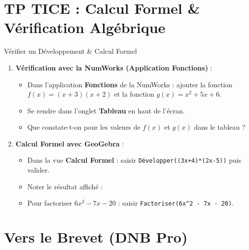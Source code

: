 \section{TP TICE : Calcul Formel \& Vérification Algébrique}

\begin{tpinfo}{Vérifier un Développement \& Calcul Formel}
\begin{enumerate}
    \item \textbf{Vérification avec la NumWorks (Application Fonctions)} :
    \begin{itemize}
        \item Dans l'application \textbf{Fonctions} de la NumWorks : ajouter la fonction $f(x) = (x+3)(x+2)$ et la fonction $g(x) = x^2 + 5x + 6$.
        \item Se rendre dans l'onglet \textbf{Tableau} en haut de l'écran.
        \item Que constate-t-on pour les valeurs de $f(x)$ et $g(x)$ dans le tableau ? \pointille[4cm]
    \end{itemize}
    \item \textbf{Calcul Formel avec GeoGebra} :
    \begin{itemize}
        \item Dans la vue \textbf{Calcul Formel} : saisir \texttt{Développer((3x+4)*(2x-5))} puis valider.
        \item Noter le résultat affiché : \pointille[6cm]
        \item Pour factoriser $6x^2 - 7x - 20$ : saisir \texttt{Factoriser(6x\^{}2 - 7x - 20)}.
    \end{itemize}
\end{enumerate}
\end{tpinfo}

\section{Vers le Brevet (DNB Pro)}


